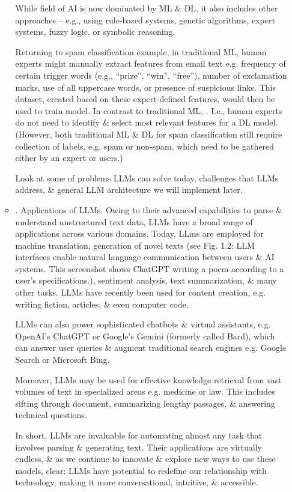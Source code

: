 \documentclass{article}
\begin{document}
\begin{itemize}
\begin{itemize}
		While field of AI is now dominated by ML \& DL, it also includes other approaches -- e.g., using rule-based systems, genetic algorithms, expert systems, fuzzy logic, or symbolic reasoning.
		
		Returning to spam classification example, in traditional ML, human experts might manually extract features from email text e.g. frequency of certain trigger words (e.g., ``prize'', ``win'', ``free''), number of exclamation marks, use of all uppercase words, or presence of suspicious links. This dataset, created based on these expert-defined features, would then be used to train model. In contrast to traditional ML, . I.e., human experts do not need to identify \& select most relevant features for a DL model. (However, both traditional ML \& DL for spam classification still require collection of labels, e.g. spam or non-spam, which need to be gathered either by an expert or users.)
		
		Look at some of problems LLMs can solve today, challenges that LLMs address, \& general LLM architecture we will implement later.		
		\item {. Applications of LLMs.} Owing to their advanced capabilities to parse \& understand unstructured text data, LLMs have a broad range of applications across various domains. Today, LLms are employed for machine translation, generation of novel texts (see {\sf Fig. 1.2: LLM interfaces enable natural language communication between users \& AI systems. This screenshot shows ChatGPT writing a poem according to a user's specifications.}), sentiment analysis, text summarization, \& many other tasks. LLMs have recently been used for content creation, e.g. writing fiction, articles, \& even computer code.
		
		LLMs can also power sophisticated chatbots \& virtual assistants, e.g. OpenAI's ChatGPT or Google's Gemini (formerly called Bard), which can answer user queries \& augment traditional search engines e.g. Google Search or Microsoft Bing.
		
		Moreover, LLMs may be used for effective knowledge retrieval from vast volumes of text in specialized areas e.g. medicine or law. This includes sifting through document, summarizing lengthy passages, \& answering technical questions.
		
		In short, LLMs are invaluable for automating almost any task that involves parsing \& generating text. Their applications are virtually endless, \& as we continue to innovate \& explore new ways to use these models, clear: LLMs have potential to redefine our relationship with technology, making it more conversational, intuitive, \& accessible.
		

\end{itemize}
\end{itemize}
\end{document}
